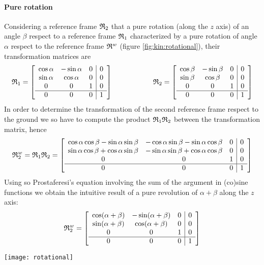 		\paragraph{Pure rotation} Considering a reference frame $\mathfrak {R}_{2}$ that a pure rotation (along the $z$ axis) of an angle $\beta$ respect to a reference frame $\mathfrak {R}_{1}$ characterized by a pure rotation of angle $\alpha$ respect to the reference frame $\mathfrak{R}^w$ (figure \ref{fig:kin:rotational}), their transformation matrices are
		\[ \mathfrak {R}_{1} = \begin{bmatrix}  \begin{array}{c c c | c} \cos \alpha & -\sin \alpha & 0 & 0 \\ \sin\alpha & \cos \alpha & 0 & 0 \\ 0 & 0 & 1 & 0 \\ \hline 0 & 0 & 0 & 1 \end{array} \end{bmatrix} \hspace{2cm} \mathfrak {R}_{2} = \begin{bmatrix}  \begin{array}{c c c | c} \cos \beta & -\sin \beta & 0 & 0 \\ \sin\beta & \cos \beta & 0 & 0 \\ 0 & 0 & 1 & 0 \\ \hline 0 & 0 & 0 & 1 \end{array} \end{bmatrix} \]
		In order to determine the transformation of the second reference frame respect to the ground we so have to compute the product $\mathfrak {R}_{1} \mathfrak {R}_{2}$ between the transformation matrix, hence
		\[ \mathfrak {R}_{2}^w = \mathfrak {R}_{1} \mathfrak {R}_{2} = \begin{bmatrix}  \begin{array}{c c c | c} \cos \alpha \cos \beta -\sin\alpha\sin\beta & -\cos \alpha \sin \beta -\sin\alpha \cos \beta & 0 & 0 \\ \sin\alpha\cos\beta + \cos\alpha\sin\beta & -\sin\alpha\sin\beta + \cos\alpha\cos\beta & 0 & 0 \\ 0 & 0 & 1 & 0 \\ \hline 0 & 0 & 0 & 1 \end{array} \end{bmatrix} \]
		Using so Prostaferesi's equation involving the sum of the argument in (co)sine functions we obtain the intuitive result of a pure revolution of $\alpha + \beta$ along the $z$ axis:
		\[ \mathfrak {R}_{2}^w = \begin{bmatrix}  \begin{array}{c c c | c} \cos (\alpha +\beta) & -\sin (\alpha + \beta) & 0 & 0 \\ \sin(\alpha + \beta) & \cos (\alpha + \beta) & 0 & 0 \\ 0 & 0 & 1 & 0 \\ \hline 0 & 0 & 0 & 1 \end{array} \end{bmatrix} \]
		\begin{SCfigure}[2][bht]
			\centering \texttt{[image: rotational]}
			\caption{multiple transformations of pure rotation revolving the $z$ axis.} \label{fig:kin:rotational}
		\end{SCfigure}
		
